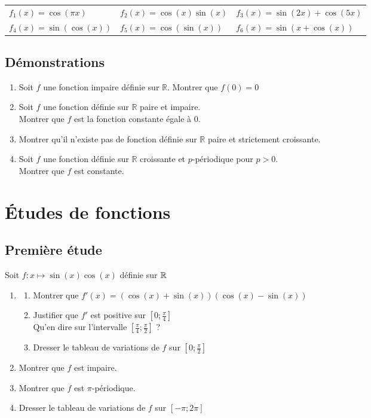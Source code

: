 \documentclass[oneside,12pt]{book}          %
\begin{document}
\renewcommand{\arraystretch}{1.5}
\begin{tabular}{p{} p{} p{}}
	$f_1(x)=\cos(\pi x)$ & $f_2(x)=\cos(x)\sin(x)$ & $f_3(x)=\sin(2x)+\cos(5x)$ \\
	$f_4(x)=\sin(\cos(x))$ & $f_5(x)=\cos(\sin(x))$ & $f_6(x)=\sin(x+\cos(x))$
\end{tabular}



\subsection{Démonstrations}
\begin{enumerate}
    \item Soit $ f $ une fonction impaire définie sur $ \mathbb{R} $. Montrer que $ f(0) = 0 $
    \item Soit $ f $ une fonction définie sur $ \mathbb{R} $ paire et impaire.\\
    Montrer que $ f $ est la fonction constante égale à 0.
    \item Montrer qu'il n'existe pas de fonction définie sur $ \mathbb{R} $ paire et strictement croissante.
    \item Soit $ f $ une fonction définie sur $ \mathbb{R} $ croissante et $ p $-périodique pour $ p > 0 $.\\
    Montrer que $ f $ est constante.
\end{enumerate}



\section{Études de fonctions}

\subsection{Première étude}
Soit $f:x\mapsto\sin(x)\cos(x)$ définie sur ${\mathbb R}$
\begin{enumerate}
    \item \begin{enumerate}
        \item Montrer que $f'(x)=(\cos(x)+\sin(x))(\cos(x)-\sin(x))$
        \item Justifier que $f'$ est positive sur $[0;\frac{\pi}{4}]$\\
        Qu'en dire sur l'intervalle $[\frac{\pi}{4};\frac{\pi}{2}]$ ?
        \item Dresser le tableau de variations de $f$ sur $[0;\frac{\pi}{2}]$
    \end{enumerate}
    \item Montrer que $f$ est impaire.
    \item Montrer que $f$ est $\pi$-périodique.
    \item Dresser le tableau de variations de $f$ sur $[-\pi;2\pi]$
\end{enumerate}
\end{document}
